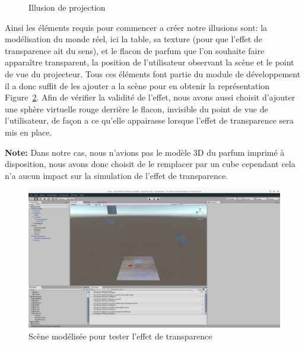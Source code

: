 \begin{figure}[H]
\centering
\caption{Illusion de projection}
\label{fig:projpov}
\end{figure}

Ainsi les éléments requis pour commencer a créer notre illusions sont: la modélisation du monde réel, ici la table, sa texture (pour que l'effet de transparence ait du sens), et le flacon de parfum que l'on souhaite faire apparaître transparent, la position de l'utilisateur observant la scène et le point de vue du projecteur. Tous ces éléments font partie du module de développement il a donc suffit de les ajouter a la scène pour en obtenir la représentation Figure~\ref{fig:unity:projscene}.
Afin de vérifier la validité de l'effet, nous avons aussi choisit d'ajouter une sphère virtuelle rouge derrière le flacon, invisible du point de vue de l'utilisateur, de façon a ce qu'elle appairasse lorsque l'effet de transparence sera mis en place.

\textbf{Note:} Dans notre cas, nous n'avions pas le modèle 3D du parfum imprimé à disposition, nous avons donc choisit de le remplacer par un cube cependant cela n'a aucun impact sur la simulation de l'effet de transparence.

\begin{figure}[H]
\centering
\includegraphics[width=0.75\linewidth, trim = 12cm 12cm 20cm 4.5cm, clip]{images/Unity-Projection-RealScene}
\caption{Scène modélisée pour tester l'effet de transparence}
\label{fig:unity:projscene}
\end{figure}


